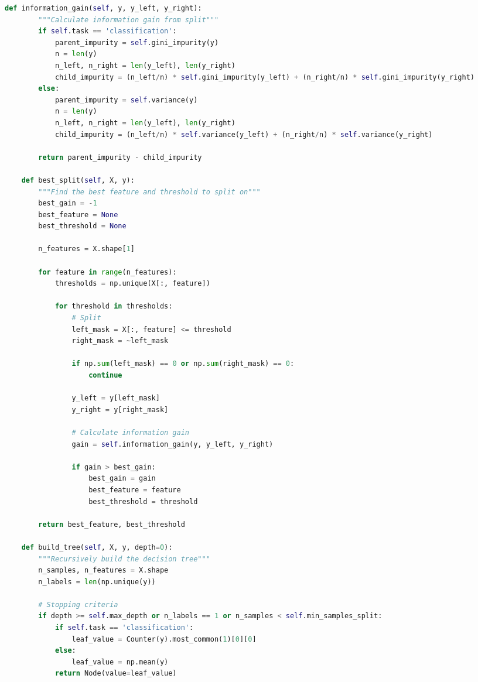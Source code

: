 \documentclass[8pt,landscape]{article}
\begin{document}
\begin{multicols}{3}
\begin{lstlisting}[language=Python]
    def information_gain(self, y, y_left, y_right):
        """Calculate information gain from split"""
        if self.task == 'classification':
            parent_impurity = self.gini_impurity(y)
            n = len(y)
            n_left, n_right = len(y_left), len(y_right)
            child_impurity = (n_left/n) * self.gini_impurity(y_left) + (n_right/n) * self.gini_impurity(y_right)
        else:
            parent_impurity = self.variance(y)
            n = len(y)
            n_left, n_right = len(y_left), len(y_right)
            child_impurity = (n_left/n) * self.variance(y_left) + (n_right/n) * self.variance(y_right)

        return parent_impurity - child_impurity

    def best_split(self, X, y):
        """Find the best feature and threshold to split on"""
        best_gain = -1
        best_feature = None
        best_threshold = None

        n_features = X.shape[1]

        for feature in range(n_features):
            thresholds = np.unique(X[:, feature])

            for threshold in thresholds:
                # Split
                left_mask = X[:, feature] <= threshold
                right_mask = ~left_mask

                if np.sum(left_mask) == 0 or np.sum(right_mask) == 0:
                    continue

                y_left = y[left_mask]
                y_right = y[right_mask]

                # Calculate information gain
                gain = self.information_gain(y, y_left, y_right)

                if gain > best_gain:
                    best_gain = gain
                    best_feature = feature
                    best_threshold = threshold

        return best_feature, best_threshold

    def build_tree(self, X, y, depth=0):
        """Recursively build the decision tree"""
        n_samples, n_features = X.shape
        n_labels = len(np.unique(y))

        # Stopping criteria
        if depth >= self.max_depth or n_labels == 1 or n_samples < self.min_samples_split:
            if self.task == 'classification':
                leaf_value = Counter(y).most_common(1)[0][0]
            else:
                leaf_value = np.mean(y)
            return Node(value=leaf_value)


\end{lstlisting}
\end{multicols}
\end{document}
